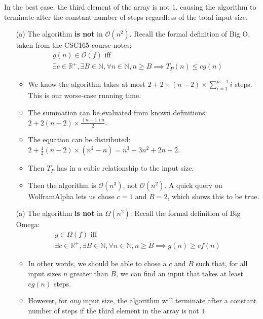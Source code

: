 \documentclass{article}
\begin{document}
\begin{enumerate}
    In the best case, the third element of the array is not $1$, causing the algorithm to terminate after the constant number of steps regardless of the total input size.
    \begin{enumerate}
    \item [(a)] The algorithm \textbf{is not} in $\mathcal{O}(n^2)$. Recall the formal definition of Big O, taken from the CSC165 course notes:
        \begin{gather*}
            g(n) \in \mathcal{O}(f) \text{ iff} \\
            \exists c \in \mathbb{R^+}, \exists B \in \mathbb{N}, \forall n \in \mathbb{N}, n \geq B \implies T_P(n) \leq cg(n)
        \end{gather*}
        \begin{itemize}
        \item We know the algorithm takes at most $2 + 2 \times (n - 2) \times \sum_{i = 1}^{n - 1} i$ steps. This is our worse-case running time.
        \item The summation can be evaluated from known definitions: $2 + 2 (n - 2) \times \frac{(n - 1) n}{2}$.
        \item The equation can be distributed: $2 + \frac{1}{2} (n - 2) \times (n^2 - n) = n^3 - 3n^2 + 2n + 2$.
        \item Then $T_P$ has in a cubic relationship to the input size.
        \item Then the algorithm is $\mathcal O(n^3)$, not $\mathcal O(n^2)$. A quick query on WolframAlpha lets us chose $c = 1$ and $B = 2$, which shows this to be true.
        \end{itemize}
    \end{enumerate}
    \begin{enumerate}
    \item [(a)] The algorithm \textbf{is not} in $\Omega(n^2)$. Recall the formal definition of Big Omega:
        \begin{gather*}
            g \in \Omega(f) \text{ iff} \\
            \exists c \in \mathbb{R^+}, \exists B \in \mathbb{N}, \forall n \in \mathbb{N}, n \geq B \implies g(n) \geq cf(n)
        \end{gather*}
        \begin{itemize}
        \item In other words, we should be able to chose a $c$ and $B$ such that, for all input sizes $n$ greater than $B$, we can find an input that takes at least $cg(n)$ steps.
        \item However, for \textit{any} input size, the algorithm will terminate after a constant number of steps if the third element in the array is not $1$.

\end{itemize}
\end{enumerate}
\end{enumerate}
\end{document}

